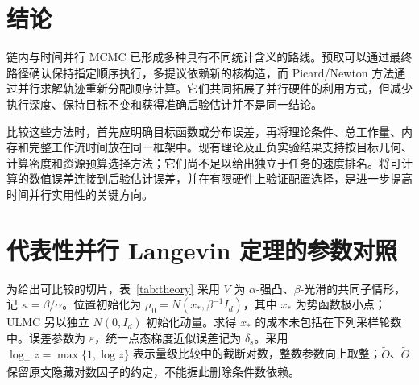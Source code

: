 \documentclass[UTF8,a4paper,zihao=-4,fontset=fandol]{ctexart}
\begin{document}
\section{结论}

链内与时间并行 MCMC 已形成多种具有不同统计含义的路线。预取可以通过最终路径确认保持指定顺序执行，多提议依赖新的核构造，而 Picard/Newton 方法通过并行求解轨迹重新分配顺序计算。它们共同拓展了并行硬件的利用方式，但减少执行深度、保持目标不变和获得准确后验估计并不是同一结论。

比较这些方法时，首先应明确目标函数或分布误差，再将理论条件、总工作量、内存和完整工作流时间放在同一框架中。现有理论及正负实验结果支持按目标几何、计算密度和资源预算选择方法；它们尚不足以给出独立于任务的速度排名。将可计算的数值误差连接到后验估计误差，并在有限硬件上验证配置选择，是进一步提高时间并行实用性的关键方向。

\clearpage
\appendix
\section{代表性并行 Langevin 定理的参数对照}\label{app:theory}

为给出可比较的切片，表~\ref{tab:theory} 采用 $V$ 为 $\alpha$-强凸、$\beta$-光滑的共同子情形，记 $\kappa=\beta/\alpha$。位置初始化为 $\mu_0=N(x_*,\beta^{-1}I_d)$，其中 $x_*$ 为势函数极小点；ULMC 另以独立 $N(0,I_d)$ 初始化动量。求得 $x_*$ 的成本未包括在下列采样轮数中。误差参数为 $\varepsilon$，统一点态梯度近似误差记为 $\delta_s$。采用 $\log_+z=\max\{1,\log z\}$ 表示量级比较中的截断对数，整数参数向上取整；$\widetilde O$、$\widetilde\Theta$ 保留原文隐藏对数因子的约定，不能据此删除条件数依赖。
\end{document}
